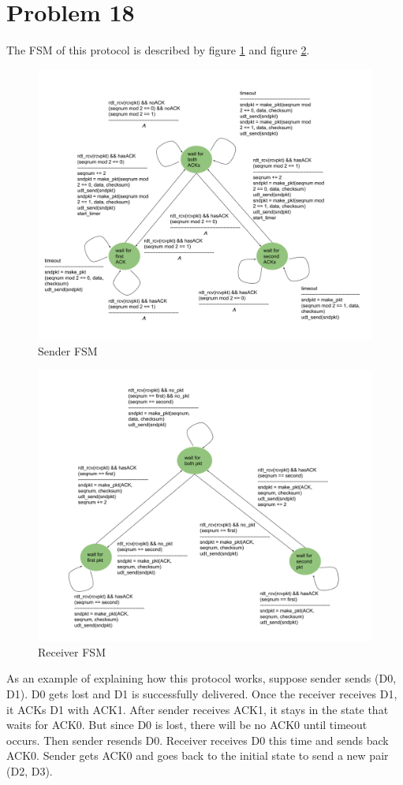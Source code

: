 \documentclass[titlepage, paper=a4, fontsize=11pt]{scrartcl} %
\numberwithin{equation}{section} %
\numberwithin{table}{section} %
\begin{document}
\section*{Problem 18}
The FSM of this protocol is described by figure \ref{fig:p18-s} and figure \ref{fig:p18-r}.
\begin{figure}[!ht]
    \includegraphics[width=\textwidth]{images/P18-sender.pdf}
    \caption{Sender FSM}
    \label{fig:p18-s}
\end{figure}
\begin{figure}[!ht]
    \includegraphics[width=\textwidth]{images/P18-receiver.pdf}
    \caption{Receiver FSM}
    \label{fig:p18-r}
\end{figure}
As an example of explaining how this protocol works, suppose sender sends (D0, D1).
D0 gets lost and D1 is successfully delivered. Once the receiver receives D1, it ACKs D1 with ACK1.
After sender receives ACK1, it stays in the state that waits for ACK0. But since D0 is lost, there will be no ACK0 until timeout occurs. Then sender resends D0. Receiver receives D0 this time and sends back ACK0. Sender gets ACK0 and goes back to the initial state to send a new pair (D2, D3).
\end{document}
